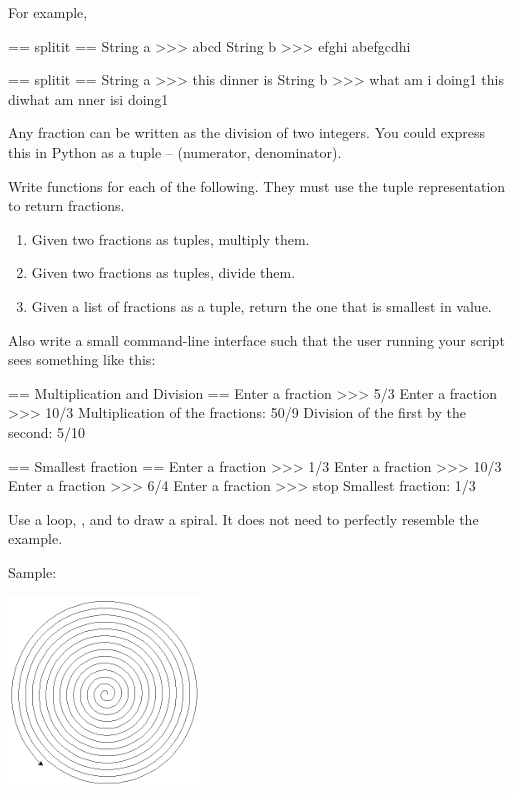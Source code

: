 \documentclass[11pt]{cselabheader}
\begin{document}
\begin{ex}[stringfun.py]
\begin{description}
  For example,

  \begin{verbatimcode}
== splitit ==
String a >>> abcd
String b >>> efghi
abefgcdhi
  \end{verbatimcode}

  \begin{verbatimcode}
== splitit ==
String a >>> this dinner is
String b >>> what am i doing1
this diwhat am nner isi doing1
  \end{verbatimcode}
\end{description}

\end{ex}

\begin{ex}[fractions.py] Any fraction can be written as the division of two
  integers. You could express this in Python as a tuple --
  (numerator, denominator).

  Write functions for each of the following. They must use the tuple
  representation to return fractions.
  \begin{enumerate}
    \item Given two fractions as tuples, multiply them.
    \item Given two fractions as tuples, divide them.
    \item Given a list of fractions as a tuple, return the one that is
      smallest in value.
  \end{enumerate}

  Also write a small command-line interface such that the user running your
  script sees something like this:

  \begin{verbatimcode}
== Multiplication and Division ==
Enter a fraction >>> 5/3
Enter a fraction >>> 10/3
Multiplication of the fractions: 50/9
Division of the first by the second: 5/10

== Smallest fraction ==
Enter a fraction >>> 1/3
Enter a fraction >>> 10/3
Enter a fraction >>> 6/4
Enter a fraction >>> stop
Smallest fraction: 1/3
  \end{verbatimcode}
\end{ex}


\begin{ex}[spiral.py] Use a  loop, , and
   to draw a spiral. It does not need to perfectly resemble
  the example.

  Sample:
  \begin{center}
    \includegraphics[width=2.0in]{img/spiral}
  \end{center}
\end{ex}
\end{document}
